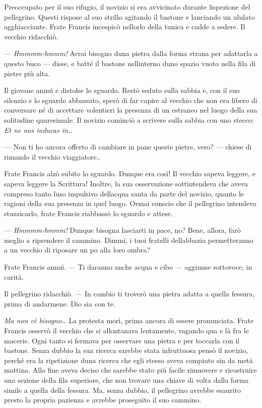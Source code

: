 Preoccupato per il suo rifugio, il novizio si era avvicinato durante
l\textquotesingle ispezione del pellegrino. Questi rispose al suo
strillo agitando il bastone e lanciando un ululato agghiacciante. Frate
Francis incespicò nell\textquotesingle orlo della tunica e cadde a
sedere. Il vecchio ridacchiò.

--- \emph{Hmmmm-hmmm!} Avrai bisogno d\textquotesingle una pietra dalla
forma strana per adattarla a questo buco --- disse, e batté il bastone
nell\textquotesingle interno d\textquotesingle uno spazio vuoto nella
fila di pietre più alta.

Il giovane annuì e distolse lo sguardo. Restò seduto sulla sabbia e, con
il suo silenzio e lo sguardo abbassato, sperò di far capire al vecchio
che non era libero di conversare né di accettare volentieri la presenza
di un estraneo nel luogo della sua solitudine quaresimale. Il novizio
cominciò a scrivere sulla sabbia con uno stecco: \emph{Et ne nos inducas
	in\ldots{}}

--- Non ti ho ancora offerto di cambiare in pane queste pietre, vero?
--- chiese di rimando il vecchio viaggiatore..

Frate Francis alzò subito lo sguardo. Dunque era così! Il vecchio sapeva
leggere, e sapeva leggere la Scrittura! Inoltre, la sua osservazione
sottintendeva che aveva compreso tanto l\textquotesingle uso impulsivo
dell\textquotesingle acqua santa da parte del novizio, quanto le ragioni
della sua presenza in quel luogo. Ormai conscio che il pellegrino
intendeva stuzzicarlo, frate Francis riabbassò lo sguardo e attese.

--- \emph{Hmmmm-hmmm!} Dunque bisogna lasciarti in pace, no? Bene,
allora, farò meglio a riprendere il cammino. Dimmi, i tuoi fratelli
dell\textquotesingle abbazia permetteranno a un vecchio di riposare un
po\textquotesingle{} alla loro ombra?

Frate Francis annuì. --- Ti daranno anche acqua e cibo --- aggiunse
sottovoce, in carità.

Il pellegrino ridacchiò. --- In cambio ti troverò una pietra adatta a
quella fessura, prima di andarmene. Dio sia con te.

\emph{Ma non c\textquotesingle è bisogno\ldots{}} La protesta morì,
prima ancora di essere pronunciata. Frate Francis osservò il vecchio che
si allontanava lentamente, vagando qua e là fra le macerie. Ogni tanto
si fermava per osservare una pietra e per toccarla con il bastone. Senza
dubbio la sua ricerca sarebbe stata infruttuosa pensò il novizio, perché
era la ripetizione d\textquotesingle una ricerca che egli stesso aveva
compiuto sin da metà mattina. Alla fine aveva deciso che sarebbe stato
più facile rimuovere e ricostruire una sezione della fila superiore, che
non trovare una chiave di volta dalla forma simile a quella della
fessura. Ma, senza dubbio, il pellegrino avrebbe esaurito presto la
propria pazienza e avrebbe proseguito il suo cammino.

